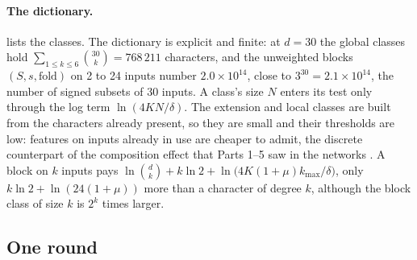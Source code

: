 \begin{table}[t]
\centering{\footnotesize\setlength{\tabcolsep}{4pt}
}
\caption{DFG's dictionary at $d=30$ . Each row is a class: a set of candidates enumerated together and tested with one union bound. ``Rows tested'': a budgeted search runs on the first $m$ rows (\cref{sec:smalln}); at $d=30$ that is every row of the grid except for degrees 5 and 6 (in brackets: in the final fit at $n\le512$). For the extensions, $b\le32$ is the number of current characters extended; for the local class, $V$ is the set of inputs of the current characters. $N$ is the count the union bound pays for, and $\ln(4KN/\delta)$ the log term of the threshold, with $K=4$ and $\delta=0.1$. ``Smallest $n$ that can pass'': for characters and blocks, no member can pass its test on fewer rows, for any labels (\cref{prop:floor}); for the dense moves, a condition of the code.  explains every entry. Source:  via  (\texttt{tab\_dictionary}; values in ).}
\label{tab:dictionary}
\end{table}

\paragraph{The dictionary.}  lists the classes. The dictionary is explicit and finite: at $d=30$ the global classes hold $\sum_{1\le k\le6}\binom{30}k=768\,211$ characters, and the unweighted blocks $(S,s,\text{fold})$ on 2 to 24 inputs number $2.0\times10^{14}$, close to $3^{30}=2.1\times10^{14}$, the number of signed subsets of 30 inputs. A class's size $N$ enters its test only through the log term $\ln(4KN/\delta)$. The extension and local classes are built from the characters already present, so they are small and their thresholds are low: features on inputs already in use are cheaper to admit, the discrete counterpart of the composition effect that Parts 1--5 saw in the networks \cite{gdcircuit2026}. A block on $k$ inputs pays $\ln\binom dk+k\ln2+\ln\bigl(4K(1+\mu)k_{\max}/\delta\bigr)$, only $k\ln2+\ln(24(1+\mu))$ more than a character of degree $k$, although the block class of size $k$ is $2^k$ times larger.

\subsection{One round}\label{sec:round}

